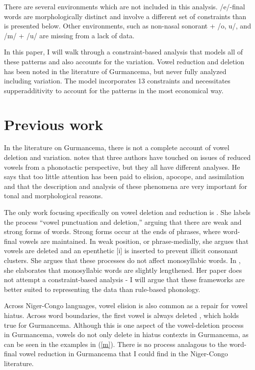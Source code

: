 \documentclass[output=paper,newtxmath,modfonts,nonflat,draftmode]{langsci/langscibook}
\begin{document}
\z

There are several environments which are not included in this analysis. /e/-final words are morphologically distinct and involve a different set of constraints than is presented below. Other environments, such as non-nasal sonorant + /o, u/, and /m/ + /u/ are missing from a lack of data. 

In this paper, I will walk through a constraint-based analysis that models all of these patterns and also accounts for the variation. Vowel reduction and deletion has been noted in the literature of Gurmancema, but never fully analyzed including variation. The model incorporates 13 constraints and necessitates supperadditivity \citep{AlbrightMagri,GreenDavis14} to account for the patterns in the most economical way. 



\section{Previous work} 

In the literature on Gurmancema, there is not a complete account of vowel deletion and variation. \citet{Naba1994} notes that three authors have touched on issues of reduced vowels from a phonotactic perspective, but they all have different analyses. He says that too little attention has been paid to elision, apocope, and assimilation and that the description and analysis of these phenomena are very important for tonal and morphological reasons.

The only work focusing specifically on vowel deletion and reduction is \citet{Rialland1980,Rialland2001}. She labels the process “vowel punctuation and deletion,'' arguing that there are weak and strong forms of words.  Strong forms occur at the ends of phrases, where word-final vowels are maintained. In weak position, or phrase-medially, she argues that vowels are deleted and an epenthetic [i] is inserted to prevent illicit consonant clusters. She argues that these processes do not affect monosyllabic words. In \citet{Rialland2001}, she elaborates that monosyllabic words are slightly lengthened. Her paper does not attempt a constraint-based analysis - I will argue that these frameworks are better suited to representing the data than rule-based phonology. 
	
Across Niger-Congo languages, vowel elision is also common as a repair for vowel hiatus. Across word boundaries, the first vowel is always deleted \citep{Casali1997}, which holds true for Gurmancema. Although this is one aspect of the vowel-deletion process in Gurmancema, vowels do not only delete in hiatus contexts in Gurmancema, as can be seen in the examples in (\ref{m}). There is no process analagous to the word-final vowel reduction in Gurmancema that I could find in the Niger-Congo literature. 
 
\end{document}
